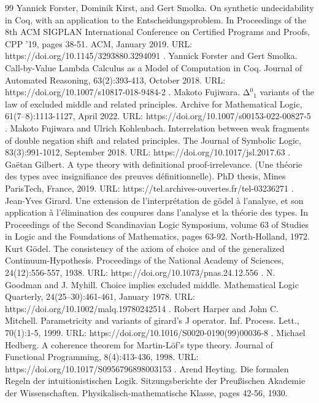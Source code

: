 \begin{thebibliography}{99}
 Yannick Forster, Dominik Kirst, and Gert Smolka. On synthetic undecidability in Coq, with an application to the Entscheidungsproblem. In Proceedings of the 8th ACM SIGPLAN International Conference on Certified Programs and Proofs, CPP ’19, pages 38-51. ACM, January 2019. URL: https://doi.org/10.1145/3293880.3294091 .
 Yannick Forster and Gert Smolka. Call-by-Value Lambda Calculus as a Model of Computation in Coq. Journal of Automated Reasoning, 63(2):393-413, October 2018. URL: https://doi.org/10.1007/s10817-018-9484-2 .
 Makoto Fujiwara. Δ\ensuremath{{}^{0}}\ensuremath{{}_{1}} variants of the law of excluded middle and related principles. Archive for Mathematical Logic, 61(7–8):1113-1127, April 2022. URL: https://doi.org/10.1007/s00153-022-00827-5 .
 Makoto Fujiwara and Ulrich Kohlenbach. Interrelation between weak fragments of double negation shift and related principles. The Journal of Symbolic Logic, 83(3):991-1012, September 2018. URL: https://doi.org/10.1017/jsl.2017.63 .
 Gaëtan Gilbert. A type theory with definitional proof-irrelevance. (Une théorie des types avec insignifiance des preuves définitionnelle). PhD thesis, Mines ParisTech, France, 2019. URL: https://tel.archives-ouvertes.fr/tel-03236271 .
 Jean-Yves Girard. Une extension de l'interprétation de gödel à l'analyse, et son application à l'élimination des coupures dans l'analyse et la théorie des types. In Proceedings of the Second Scandinavian Logic Symposium, volume 63 of Studies in Logic and the Foundations of Mathematics, pages 63-92. North-Holland, 1972.
 Kurt Gödel. The consistency of the axiom of choice and of the generalized Continuum-Hypothesis. Proceedings of the National Academy of Sciences, 24(12):556-557, 1938. URL: https://doi.org/10.1073/pnas.24.12.556 .
 N. Goodman and J. Myhill. Choice implies excluded middle. Mathematical Logic Quarterly, 24(25–30):461-461, January 1978. URL: https://doi.org/10.1002/malq.19780242514 .
 Robert Harper and John C. Mitchell. Parametricity and variants of girard’s J operator. Inf. Process. Lett., 70(1):1-5, 1999. URL: https://doi.org/10.1016/S0020-0190(99)00036-8 .
 Michael Hedberg. A coherence theorem for Martin-Löf’s type theory. Journal of Functional Programming, 8(4):413-436, 1998. URL: https://doi.org/10.1017/S0956796898003153 .
 Arend Heyting. Die formalen Regeln der intuitionistischen Logik. Sitzungsberichte der Preußischen Akademie der Wissenschaften. Physikalisch-mathematische Klasse, pages 42-56, 1930.

\end{thebibliography}
